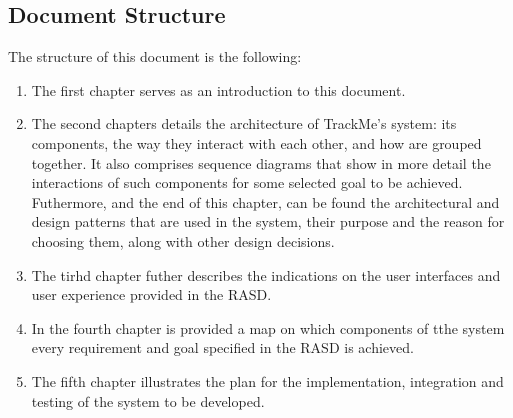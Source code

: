 \documentclass[../main.tex]{subfiles}
\begin{document}
\subsection{Document Structure}

The structure of this document is the following:

\begin{enumerate}

	\item The first chapter serves as an introduction to this document.
	\item The second chapters details the architecture of TrackMe's system: its components, the way they interact with each other, and how are grouped together. It also comprises sequence diagrams that show in more detail the interactions of such components for some selected goal to be achieved. Futhermore, and the end of this chapter, can be found the architectural and design patterns that are used in the system, their purpose and the reason for choosing them, along with other design decisions.
	\item The tirhd chapter futher describes the indications on the user interfaces and user experience provided in the RASD.
	\item In the fourth chapter is provided a map on which components of tthe system every requirement and goal specified in the RASD is achieved.
	\item The fifth chapter illustrates the plan for the implementation, integration and testing of the system to be developed.

\end{enumerate}
\end{document}

